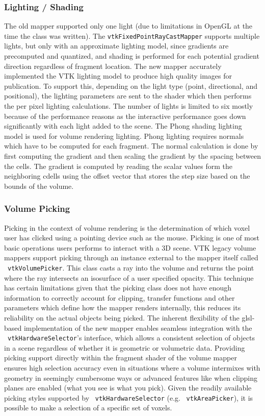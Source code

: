 \subsubsection{Lighting / Shading }
The old mapper supported only one light (due to limitations in OpenGL at the time the class was written). The \texttt{vtkFixedPointRayCastMapper} supports multiple lights, but only with an approximate lighting model, since gradients are precomputed and quantized, and shading is performed for each potential gradient direction regardless of fragment location. The new mapper accurately implemented the VTK lighting model to produce high quality images for publication. To support this, depending on the light type (point, directional, and positional), the lighting parameters are sent to the shader which then performs the per pixel lighting calculations. The number of lights is limited to six mostly because of the performance reasons as the interactive performance goes down significantly with each light added to the scene. The Phong shading lighting model is used for volume rendering lighting. Phong lighting requires normals which have to be computed for each fragment. The normal calculation is done by first computing the gradient and then scaling the gradient by the spacing between the cells. The gradient is computed by reading the scalar values form the neighboring cdells using the offset vector that stores the step size based on the bounds of the volume. 

\subsubsection{Volume Picking}
Picking in the context of volume rendering is the determination of which voxel user has clicked using a pointing device such as the mouse. Picking is one of most basic operations users performs to interact with a 3D scene. VTK legacy volume mappers support picking through an instance external to the mapper itself called ~\texttt{vtkVolumePicker}.  This class casts a ray into the volume and returns the point where the ray intersects an isosurface of a user specified opacity. This technique has certain limitations given that the picking class does not have enough information to correctly account for clipping, transfer functions and other parameters which define how the mapper renders internally, this reduces its reliability on the actual objects being picked. The inherent flexibility of the glsl-based implementation of the new mapper enables seamless integration with the ~\texttt{vtkHardwareSelector}'s interface, which allows a consistent selection of objects in a scene regardless of whether it is geometric or volumetric data.  Providing picking support directly within the fragment shader of the volume mapper ensures high selection accuracy even in situations where a volume intermixes with geometry in seemingly cumbersome ways or advanced features like when clipping planes are enabled (what you see is what you pick). Given the readily available picking styles supported by ~\texttt{vtkHardwareSelector} (e.g. ~\texttt{vtkAreaPicker}), it is possible to make a selection of a specific set of voxels.

